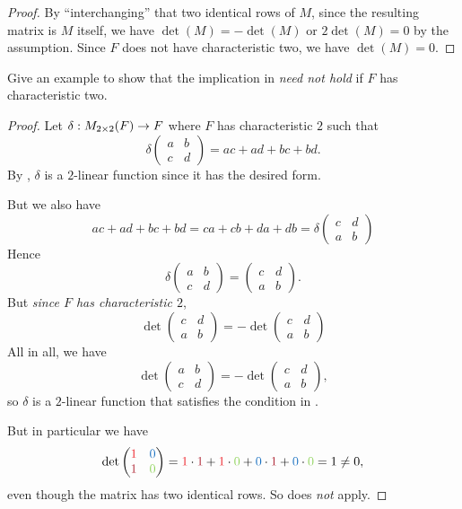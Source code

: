 \begin{proof}
By ``interchanging'' that two identical rows of \(M\), since the resulting matrix is \(M\) itself, we have \(\det(M) = -\det(M)\) or \(2 \det(M) = 0\) by the assumption.
Since \(F\) does not have characteristic two, we have \(\det(M) = 0\).
\end{proof}

\begin{exercise} \label{exercise 4.5.20}
Give an example to show that the implication in  \emph{need not hold} if \(F\) has characteristic two.
\end{exercise}

\begin{proof}
Let \(\delta : M_{2 \times 2}(F) \to F\) where \(F\) has characteristic \(2\) such that
\[
    \delta \begin{pmatrix}
        a & b \\
        c & d
    \end{pmatrix}
    = ac + ad + bc + bd.
\]
By , \(\delta\) is a \(2\)-linear function since it has the desired form.

But we also have
\[
    ac + ad + bc + bd = ca + cb + da + db = \delta \begin{pmatrix}
        c & d \\
        a & b
    \end{pmatrix}
\]
Hence
\[
    \delta \begin{pmatrix}
        a & b \\
        c & d
    \end{pmatrix}
    = \begin{pmatrix}
        c & d \\
        a & b
    \end{pmatrix}.
\]
But \emph{since \(F\) has characteristic \(2\)},
\[
    \det \begin{pmatrix}
        c & d \\
        a & b
    \end{pmatrix}
    = - \det \begin{pmatrix}
        c & d \\
        a & b
    \end{pmatrix}
\]
All in all, we have
\[
    \det \begin{pmatrix}
        a & b \\
        c & d
    \end{pmatrix}
    = - \det \begin{pmatrix}
        c & d \\
        a & b
    \end{pmatrix},
\]
so \(\delta\) is a \(2\)-linear function that satisfies the condition in .

But in particular we have
\[
    \det \begin{pmatrix}
        \RED{1} & \BLUE{0} \\
        \MAROON{1} & \GREEN{0}
    \end{pmatrix}
    = \RED{1} \cdot \MAROON{1} + \RED{1} \cdot \GREEN{0} + \BLUE{0} \cdot \MAROON{1} + \BLUE{0} \cdot \GREEN{0}
    = 1 \ne 0,
\]
even though the matrix has two identical rows.
So  does \emph{not} apply.
\end{proof}
